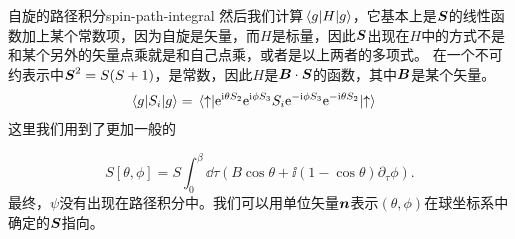 \begin{back}{自旋的路径积分}{spin-path-integral}
    然后我们计算$\mel*{g}{H}{g}$，它基本上是$\vb*{S}$的线性函数加上某个常数项，因为自旋是矢量，而$H$是标量，因此$\vb*{S}$出现在$H$中的方式不是和某个另外的矢量点乘就是和自己点乘，或者是以上两者的多项式。
    在一个不可约表示中$\vb*{S}^2 = S(S+1)$，是常数，因此$H$是$\vb*{B} \cdot \vb*{S}$的函数，其中$\vb*{B}$是某个矢量。
    \[
        \begin{aligned}
            \mel*{g}{S_i}{g} &= \mel*{\uparrow}{\mathrm{e}^{\mathrm{i} \theta S_2} \mathrm{e}^{\mathrm{i} \phi S_3} S_i \mathrm{e}^{- \mathrm{i} \phi S_3} \mathrm{e}^{- \mathrm{i} \theta S_2}}{\uparrow}
        \end{aligned}
    \]
    这里我们用到了更加一般的

    \begin{equation}
        S[\theta, \phi] = S \int_0^\beta \dd{\tau} (B \cos \theta + \ii (1 - \cos \theta) \partial_\tau \phi).
        \label{eq:spin-path-integral}
    \end{equation}
    最终，$\psi$没有出现在路径积分中。我们可以用单位矢量$\vb*{n}$表示$(\theta, \phi)$在球坐标系中确定的$\vb*{S}$指向。
\end{back}
